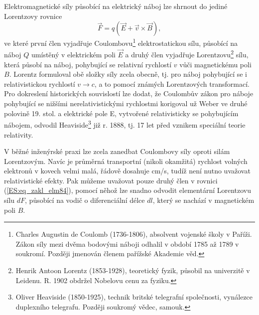       Elektromagnetické síly působící na elektrický náboj lze shrnout do jediné Lorentzovy rovnice
      \begin{equation}\label{ES:eq_zakl_elm84}
        \vec{F}=q(\vec{E}+\vec{v}\times\vec{B}),
      \end{equation}
      ve které první člen vyjadřuje Coulombovu\footnote{Charles Augustin de Coulomb (1736-1806), 
      absolvent vojenské školy v Paříži. Zákon síly mezi dvěma bodovými náboji odhalil v období 
      1785 až 1789 v soukromí. Později jmenován členem pařížské Akademie věd.} elektrostatickou 
      sílu, působící na náboj \(Q\) umístěný v elektrickém poli \(\vec{E}\) a druhý člen vyjadřuje 
      Lorentzovu\footnote{Henrik Antoon Lorentz (1853-1928), teoretický fyzik, působil na 
      univerzitě v Leidenu. R. 1902 obdržel Nobelovu cenu za fyziku.} sílu, která působí na 
      náboj, pohybující se relativní rychlostí \(v\) vůči magnetickému poli \(B\). Lorentz 
      formuloval obě složky síly zcela obecně, tj. pro náboj pohybující se i relativistickou 
      rychlostí \(v \rightarrow c\), a to pomocí známých Lorentzových transformací. Pro 
      dokreslení historických souvislostí lze dodat, že Coulombův zákon pro náboje pohybující se 
      nižšími nerelativistickými rychlostmi korigoval už Weber ve druhé polovině 19. stol.
      a elektrické pole E, vytvořené relativisticky se pohybujícím nábojem, odvodil 
      Heaviside\footnote{Oliver Heaviside (1850-1925), technik britské telegrafní společnosti, 
      vynálezce duplexního telegrafu. Později soukromý vědec, samouk.} již r. 1888, tj. 17 let před 
      vznikem speciální teorie relativity. 
      
      V běžné inženýrské praxi lze zcela zanedbat Coulombovy síly oproti silám Lorentzovým. Navíc 
      je průměrná transportní (nikoli okamžitá) rychlost volných elektronů v kovech velmi malá, 
      řádově dosahuje \si{\cm/\s}, tudíž není nutno uvažovat relativistické efekty. Pak 
      můžeme uvažovat pouze druhý člen v rovnici (\ref{ES:eq_zakl_elm84}), pomocí něhož lze snadno 
      odvodit elementární Lorentzovu sílu \(dF\), působící na vodič o diferenciální délce \(dl\), 
      který se nachází v magnetickém poli \(B\).
       
